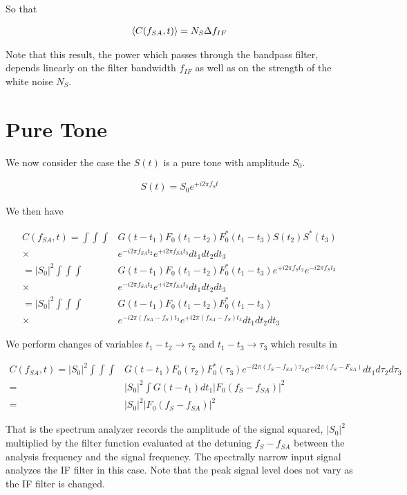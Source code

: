 \documentclass[12pt]{article}
\begin{document}
So that

\begin{align}
\Braket{C(f_{SA}, t)} = N_S \Delta f_{IF}
\end{align}

Note that this result, the power which passes through the bandpass filter, depends linearly on the filter bandwidth $f_{IF}$ as well as on the strength of the white noise $N_S$.

\section{Pure Tone}

We now consider the case the $S(t)$ is a pure tone with amplitude $S_0$.

\begin{align}
S(t) = S_0 e^{+i2\pi f_S t}
\end{align}

We then have

\begin{align}
C(f_{SA},t) =\int \int \int &G(t-t_1)F_0(t_1-t_2)F_0^*(t_1-t_3)S(t_2)S^*(t_3)\\
\times& e^{-i2\pi f_{SA} t_2} e^{+i2\pi f_{SA}t_3} dt_1 dt_2 dt_3\\
=|S_0|^2\int \int \int &G(t-t_1)F_0(t_1-t_2)F_0^*(t_1-t_3)e^{+i2\pi f_St_2}e^{-i2\pi f_St_3}\\
\times& e^{-i2\pi f_{SA} t_2} e^{+i2\pi f_{SA}t_3} dt_1 dt_2 dt_3\\
= |S_0|^2 \int \int \int &G(t-t_1)F_0(t_1-t_2)F_0^*(t_1-t_3)\\
\times& e^{-i2\pi (f_{SA}-f_S) t_2} e^{+i2\pi (f_{SA}-f_S)t_3} dt_1 dt_2 dt_3
\end{align}

We perform changes of variables $t_1-t_2 \rightarrow \tau_2$ and $t_1-t_3 \rightarrow \tau_3$ which results in

\begin{align}
C(f_{SA},t) =|S_0|^2\int \int \int &G(t-t_1) F_0(\tau_2)F_0^*(\tau_3) e^{-i2\pi(f_S-f_{SA})\tau_2}e^{+i2\pi(f_S-F_{SA})} dt_1d\tau_2d\tau_3\\
 =& |S_0|^2\int G(t-t_1) dt_1 |F_0(f_S-f_{SA})|^2\\
 =& |S_0|^2 |F_0(f_S-f_{SA})|^2
\end{align}

That is the spectrum analyzer records the amplitude of the signal squared, $|S_0|^2$ multiplied by the filter function evaluated at the detuning $f_S - f_{SA}$ between the analysis frequency and the signal frequency.
The spectrally narrow input signal analyzes the IF filter in this case.
Note that the peak signal level does not vary as the IF filter is changed.
\end{document}
